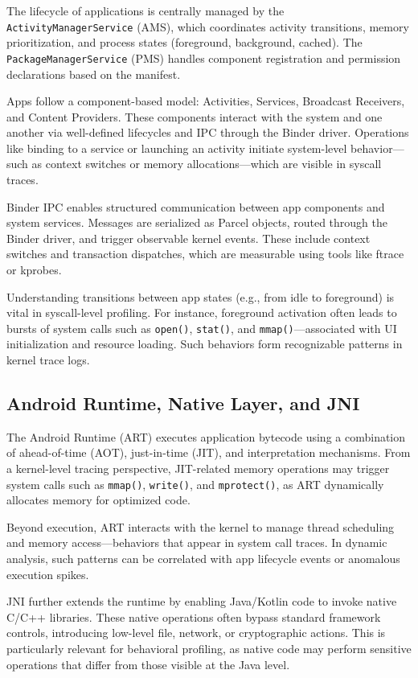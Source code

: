 \documentclass[a4paper,12pt]{report}
\begin{document}
The lifecycle of applications is centrally managed by the \texttt{ActivityManagerService} (AMS), which coordinates activity transitions, memory prioritization, and process states (foreground, background, cached). The \texttt{PackageManagerService} (PMS) handles component registration and permission declarations based on the manifest.

Apps follow a component-based model: Activities, Services, Broadcast Receivers, and Content Providers. These components interact with the system and one another via well-defined lifecycles and IPC through the Binder driver. Operations like binding to a service or launching an activity initiate system-level behavior—such as context switches or memory allocations—which are visible in syscall traces.

Binder IPC enables structured communication between app components and system services. Messages are serialized as Parcel objects, routed through the Binder driver, and trigger observable kernel events. These include context switches and transaction dispatches, which are measurable using tools like ftrace or kprobes.

Understanding transitions between app states (e.g., from idle to foreground) is vital in syscall-level profiling. For instance, foreground activation often leads to bursts of system calls such as \texttt{open()}, \texttt{stat()}, and \texttt{mmap()}—associated with UI initialization and resource loading. Such behaviors form recognizable patterns in kernel trace logs.

\subsection{Android Runtime, Native Layer, and JNI}
The Android Runtime (ART) executes application bytecode using a combination of ahead-of-time (AOT), just-in-time (JIT), and interpretation mechanisms. From a kernel-level tracing perspective, JIT-related memory operations may trigger system calls such as \texttt{mmap()}, \texttt{write()}, and \texttt{mprotect()}, as ART dynamically allocates memory for optimized code.

Beyond execution, ART interacts with the kernel to manage thread scheduling and memory access—behaviors that appear in system call traces. In dynamic analysis, such patterns can be correlated with app lifecycle events or anomalous execution spikes.

JNI further extends the runtime by enabling Java/Kotlin code to invoke native C/C++ libraries. These native operations often bypass standard framework controls, introducing low-level file, network, or cryptographic actions. This is particularly relevant for behavioral profiling, as native code may perform sensitive operations that differ from those visible at the Java level.
\end{document}
